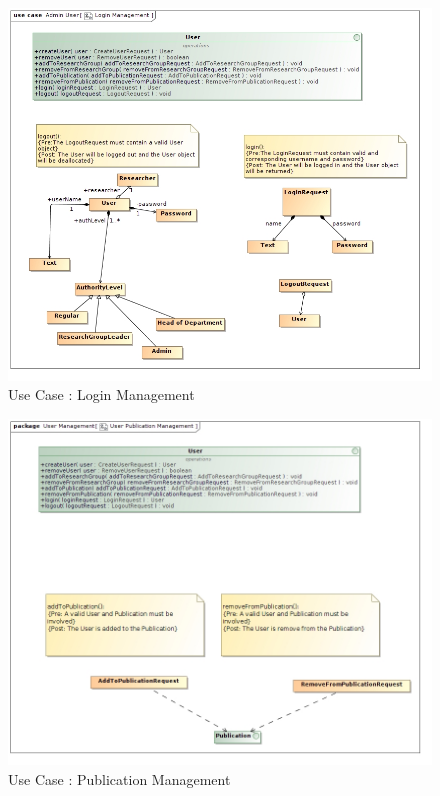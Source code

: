 \documentclass{article}
\begin{document}
		\begin{figure}[H]
			\includegraphics[scale=0.6]{ReinhardtImages/Login Management.jpg}
			\caption{Use Case : Login Management}
	  		\label{Use Case : Login Management}
		\end{figure}
		\begin{figure}[H]
			\includegraphics[scale=0.6]{ReinhardtImages/User Publication Management.jpg}
			\caption{Use Case : Publication Management}
	  		\label{Use Case : Publication Management}
		\end{figure}
\end{document}
